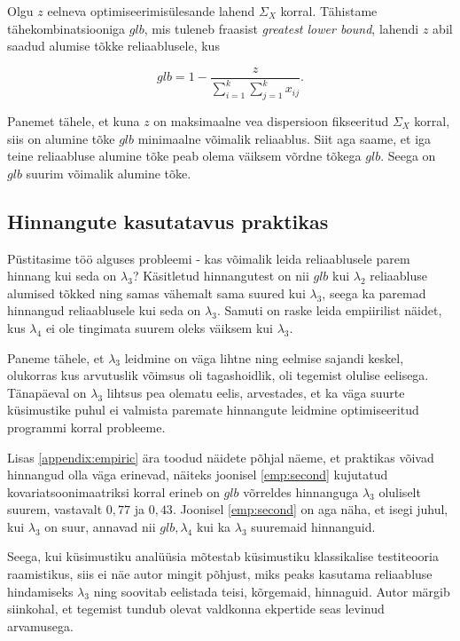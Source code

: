 \documentclass[a4paper,12pt,oneside]{article}
\numberwithin{equation}{section}
\theoremstyle{definition}
\begin{document}
Olgu $z$ eelneva optimiseerimis\"ulesande lahend $\Sigma_X$ korral. Tähistame tähekombinatsiooniga $glb$, mis tuleneb fraasist \textit{greatest lower bound}, lahendi $z$ abil saadud alumise tõkke reliaablusele, kus 

\begin{equation*}
glb = 1 - \frac{z}{\sum \limits_{i=1}^k \sum \limits_{j=1}^k x_{ij}} \text{.}
\end{equation*}  

Panemet tähele, et kuna $z$ on maksimaalne vea dispersioon fikseeritud $\Sigma_X$ korral, siis on alumine tõke $glb$ minimaalne võimalik reliaablus. Siit aga saame, et iga teine reliaabluse alumine tõke peab olema väiksem võrdne tõkega $glb$. Seega on $glb$ suurim võimalik alumine tõke. 

\subsection{Hinnangute kasutatavus praktikas}

Püstitasime töö alguses probleemi - kas võimalik leida reliaablusele parem hinnang kui seda on $\lambda_3$? Käsitletud hinnangutest on nii $glb$ kui $\lambda_2$ reliaabluse alumised tõkked ning samas vähemalt sama suured kui $\lambda_3$, seega ka paremad hinnangud reliaablusele kui seda on $\lambda_3$. Samuti on raske leida empiirilist näidet, kus  $\lambda_4$ ei ole tingimata suurem oleks väiksem kui $\lambda_3$.

Paneme tähele, et $\lambda_3$ leidmine on väga lihtne ning eelmise sajandi keskel, olukorras kus arvutuslik võimsus oli tagashoidlik, oli tegemist olulise eelisega. Tänapäeval on $\lambda_3$ lihtsus pea olematu eelis, arvestades, et ka väga suurte küsimustike puhul ei valmista paremate hinnangute leidmine optimiseeritud programmi korral probleeme. 

Lisas \ref{appendix:empiric} ära toodud näidete põhjal näeme, et praktikas võivad hinnangud olla väga erinevad, näiteks joonisel \ref{emp:second} kujutatud kovariatsoonimaatriksi korral erineb on $glb$ võrreldes hinnanguga $\lambda_3$ oluliselt suurem, vastavalt $0,77$ ja $0,43$. Joonisel \ref{emp:second} on aga näha, et isegi juhul, kui $\lambda_3$ on suur, annavad nii $glb, \lambda_4$ kui ka $\lambda_3$ suuremaid hinnanguid. 

Seega, kui küsimustiku analüüsia mõtestab küsimustiku klassikalise testiteooria raamistikus, siis ei näe autor mingit põhjust, miks peaks kasutama reliaabluse hindamiseks $\lambda_3$ ning soovitab eelistada teisi, kõrgemaid, hinnaguid. Autor märgib siinkohal, et tegemist tundub olevat valdkonna ekpertide seas levinud arvamusega.  \cite{Revelle2008} \cite{Sijtsma2009a} \cite{Cronbach2004}
\end{document}

